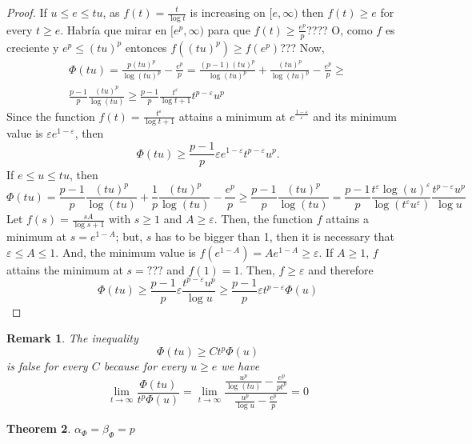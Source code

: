 \documentclass[twoside]{article}
\newtheorem{thm}{Theorem}[section]
\newtheorem{rem}[thm]{Remark}
\theoremstyle{remark}
\renewcommand{\leq}{\leqslant}
\begin{document}
\begin{proof}
If $u\leq e\leq tu$, as $f(t)=\frac{t}{\log t}$ is increasing on $[e,\infty)$ then $f(t)\geq e$ for every $t\geq e$. 
Habr\'ia que mirar en $[e^p,\infty)$ para que $f(t)\geq \frac{e^p}{p}$???? O, como $f$ es creciente y 
$e^p\leq (tu)^p$ entonces
$f((tu)^p)\geq f(e^p)$???
Now, 
\[
\begin{split}
\Phi(tu)=\frac{p(tu)^p}{\log (tu)^p}-\frac{e^p}{p}=
\frac{(p-1)(tu)^p}{\log(tu)^p}+\frac{(tu)^p}{\log (tu)^p}-\frac{e^p}{p}\geq 
\\
\frac{p-1}{p}\frac{(tu)^p}{\log(tu)}\geq
\frac{p-1}{p}\frac{t^{\varepsilon}}{\log t+1}t^{p-\varepsilon}u^p
\end{split}
\]
Since the function $f(t)=\frac{t^{\varepsilon}}{\log t+1}$ attains a minimum at 
$e^{\frac{1-\varepsilon}{\varepsilon}}$ and its minimum value is $\varepsilon e^{1-\varepsilon}$, then  
\[
\Phi(tu)\geq \frac{p-1}{p}\varepsilon e^{1-\varepsilon}t^{p-\varepsilon}u^p.
\]
If $e\leq u\leq tu$, then 
\[
\Phi(tu)=\frac{p-1}{p}\frac{(tu)^p}{\log(tu)}
+\frac{1}{p}\frac{(tu)^p}{\log(tu)}-\frac{e^p}{p}
\geq
\frac{p-1}{p}\frac{(tu)^p}{\log(tu)}=
\frac{p-1}{p}
\frac{t^{\varepsilon} \log (u)^{\varepsilon}}{\log(t^{\varepsilon}u^{\varepsilon})}
\frac{t^{p-\varepsilon}u^p}{\log u}
\]
Let $f(s)=\frac{sA}{\log s+1}$ with $s\geq 1$ and $A\geq \varepsilon$.
Then, the function $f$ attains a minimum at $s=e^{1-A}$; but, 
$s$ has to be bigger than 1, then it is necessary that
$\varepsilon\leq A\leq 1$.
And, the minimum value is $f(e^{1-A})=Ae^{1-A}\geq \varepsilon$.
If $A\geq 1$, $f$ attains the minimum at $s=???$ and $f(1)=1$. 
Then, $f\geq \varepsilon$ and  therefore
\[
\Phi(tu)\geq \frac{p-1}{p}\varepsilon \frac{t^{p-\varepsilon}u^p}{\log u}\geq
\frac{p-1}{p}\varepsilon t^{p-\varepsilon}\Phi(u)
\]
\end{proof}







\begin{rem}
The inequality 
\[
\Phi(tu)\geq Ct^p\Phi(u)
\] 
is false for every $C$ because for every $u\geq e$ we have 
\[
\lim\limits_{t \to \infty}\frac{\Phi(tu)}{t^p\Phi(u)}=
\lim\limits_{t \to \infty} \frac{\frac{u^p}{\log(tu)}-
\frac{e^p}{pt^p}}{\frac{u^p}{\log u}-\frac{e^p}{p}}=0
\]
\end{rem}

\begin{thm}
$\alpha_{\Phi}=\beta_{\Phi}=p$
\end{thm}
\end{document}
